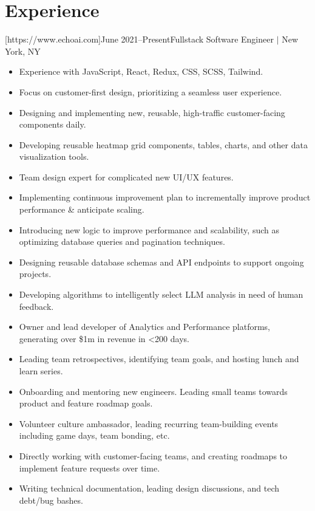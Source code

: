 \documentclass[letterpaper,11pt]{article}
\newcommand{\Item}[1]{
  \item\small{
    \parbox[t]{500pt}{\raggedright#1}
  }
}
\newenvironment{HeadingList}{
  \begin{mdframed}[
    topline=false,
    bottomline=false,
    rightline=false,
    leftline=false,
    linecolor=gray,
    linewidth=0pt,
    leftmargin=0pt,
    innerleftmargin=0pt,
    innertopmargin=0pt,
    innerbottommargin=0pt,
    innerrightmargin=0pt,
    skipabove=\parsep,
    skipbelow=\parsep,
  ]
  \begin{itemize}[itemsep=0pt, leftmargin=0pt, label={}]
}{
  \end{itemize}
  \end{mdframed}
}
\newenvironment{SubHeadingList}{
  \begin{mdframed}[
    leftline=true,
    linecolor=gray,
    linewidth=.5pt,
    leftmargin=8pt,
    innerleftmargin=8pt,
  ]
  \begin{itemize}[itemsep=0pt, leftmargin=0pt, label={}]
}{
  \end{itemize}
  \end{mdframed}
}
\newenvironment{ItemList}{
  \begin{itemize}[itemsep=0pt, topsep=-3pt, partopsep=0pt, parsep=0pt, leftmargin=20pt, label=\raisebox{0.4ex}{\scalebox{0.5}{\textbullet}}]
}{\end{itemize}}
\begin{document}
\section{Experience}
    \begin{HeadingList}
        [https://www.echoai.com]{June 2021--Present}{Fullstack Software Engineer $|$ New York, NY}
            \begin{SubHeadingList}

                \begin{ItemList}
                    \Item{Experience with JavaScript, React, Redux, CSS, SCSS, Tailwind.}
                    \Item{Focus on customer-first design, prioritizing a seamless user experience.}
                    \Item{Designing and implementing new, reusable, high-traffic customer-facing components daily.}
                    \Item{Developing reusable heatmap grid components, tables, charts, and other data visualization tools.}
                    \Item{Team design expert for complicated new UI/UX features.}
                \end{ItemList}

                \begin{ItemList}
                    \Item{Implementing continuous improvement plan to incrementally improve product performance \& anticipate scaling.}
                    \Item{Introducing new logic to improve performance and scalability, such as optimizing database queries and pagination techniques.}
                    \Item{Designing reusable database schemas and API endpoints to support ongoing projects.}
                    \Item{Developing algorithms to intelligently select LLM analysis in need of human feedback.}
                \end{ItemList}

                \begin{ItemList}
                    \Item{Owner and lead developer of Analytics and Performance platforms, generating over \$1m in revenue in \textless 200 days.}
                    \Item{Leading team retrospectives, identifying team goals, and hosting lunch and learn series.}
                    \Item{Onboarding and mentoring new engineers. Leading small teams towards product and feature roadmap goals.}
                    \Item{Volunteer culture ambassador, leading recurring team-building events including game days, team bonding, etc.}
                    \Item{Directly working with customer-facing teams, and creating roadmaps to implement feature requests over time.}
                    \Item{Writing technical documentation, leading design discussions, and tech debt/bug bashes.}
                \end{ItemList}


\end{SubHeadingList}
\end{HeadingList}
\end{document}
